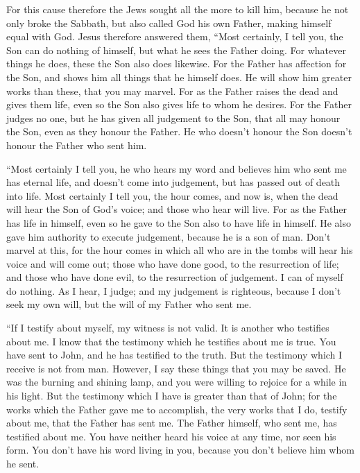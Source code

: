  For this cause therefore the Jews sought all the more to
kill him, because he not only broke the Sabbath, but also called God his
own Father, making himself equal with God.  Jesus therefore
answered them, ``Most certainly, I tell you, the Son can do nothing of
himself, but what he sees the Father doing. For whatever things he does,
these the Son also does likewise.  For the Father has
affection for the Son, and shows him all things that he himself does. He
will show him greater works than these, that you may marvel.
 For as the Father raises the dead and gives them life,
even so the Son also gives life to whom he desires.  For
the Father judges no one, but he has given all judgement to the Son,
 that all may honour the Son, even as they honour the
Father. He who doesn't honour the Son doesn't honour the Father who sent
him.

 ``Most certainly I tell you, he who hears my word and
believes him who sent me has eternal life, and doesn't come into
judgement, but has passed out of death into life.  Most
certainly I tell you, the hour comes, and now is, when the dead will
hear the Son of God's voice; and those who hear will live. 
For as the Father has life in himself, even so he gave to the Son also
to have life in himself.  He also gave him authority to
execute judgement, because he is a son of man.  Don't
marvel at this, for the hour comes in which all who are in the tombs
will hear his voice  and will come out; those who have done
good, to the resurrection of life; and those who have done evil, to the
resurrection of judgement.  I can of myself do nothing. As
I hear, I judge; and my judgement is righteous, because I don't seek my
own will, but the will of my Father who sent me.

 ``If I testify about myself, my witness is not valid.
 It is another who testifies about me. I know that the
testimony which he testifies about me is true.  You have
sent to John, and he has testified to the truth.  But the
testimony which I receive is not from man. However, I say these things
that you may be saved.  He was the burning and shining
lamp, and you were willing to rejoice for a while in his light.
 But the testimony which I have is greater than that of
John; for the works which the Father gave me to accomplish, the very
works that I do, testify about me, that the Father has sent me.
 The Father himself, who sent me, has testified about me.
You have neither heard his voice at any time, nor seen his form.
 You don't have his word living in you, because you don't
believe him whom he sent.

